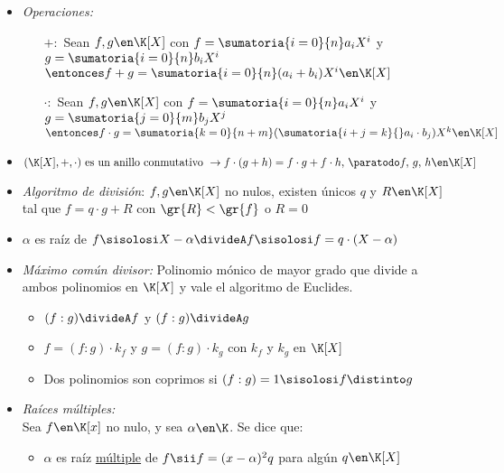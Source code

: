 \newcommand{\polGen}[1]{\sumatoria{i=0}{n} #1_i X^i}
\newcommand{\mult}[1]{\text{mult}(#1)}

\begin{itemize}
	\item \textit{Operaciones: }
	      \begin{itemize}
		      \item[$+:$] Sean $f,g \en \K[X]$ con $f = \polGen{a}$ y $g = \polGen{b}$\\
		            $\entonces f + g = \sumatoria{i=0}{n} (a_i + b_i) X^i \en \K[X]$
		      \item[$\cdot:$] Sean $f,g \en \K[X]$ con $f = \polGen{a}$ y $g = \sumatoria{j=0}{m} b_j X^j$\\
		            $\entonces f \cdot g = \sumatoria{k=0}{n+m} (\sumatoria{i+j=k}{} a_i \cdot b_j) X^k \en \K[X]$
	      \end{itemize}
	\item $(\K[X],+,\cdot) \text{ es un anillo conmutativo } \to f\cdot(g+h) = f\cdot g + f\cdot h,\, \paratodo f,\,g,\,h \en \K[X]$

	\item \textit{Algoritmo de división}: $f,g \en \K[X]$ no nulos, existen únicos $q$ y $R \en \K[X]$ tal que $f = q\cdot g + R$
      con $\gr{R} < \gr{f}$ o $R = 0$

	\item $\alpha$ es raíz de $f \sisolosi X - \alpha \divideA f \sisolosi f = q \cdot ( X - \alpha)$

	\item \textit{Máximo común divisor: } Polinomio mónico de mayor grado que divide a ambos polinomios en $\K[X]$
	      y vale el algoritmo de Euclides.
	      \begin{itemize}
		      \item $(f:g) \divideA f$ y $(f:g) \divideA g$

		      \item $f = (f:g)\cdot k_f$ y $g = (f:g)\cdot k_g$ con $k_f$ y $k_g$ en $\K[X]$

		      \item Dos polinomios son coprimos si $(f:g) = 1 \sisolosi f \distinto g$
	      \end{itemize}

	\item \textit{Raíces múltiples: }\\
	      Sea $f \en \K[x]$ no nulo, y sea $\alpha \en \K$. Se dice que:
	      \begin{itemize}
		      \item $\alpha$ es raíz \underline{múltiple} de $f \sii f = (x - \alpha)^2 q$ para algún $q \en \K[X]$


\end{itemize}
\end{itemize}
